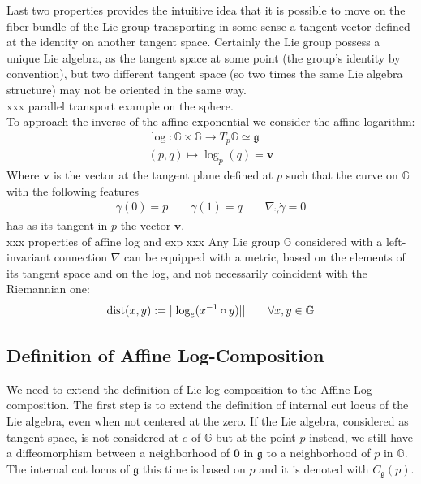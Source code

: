 Last two properties provides the intuitive idea that it is possible to move on the fiber bundle of the Lie group transporting in some sense a tangent vector defined at the identity on another tangent space. Certainly the Lie group possess a unique Lie algebra, as the tangent space at some point (the group's identity by convention), but two different tangent space (so two times the same Lie algebra structure) may not be oriented in the same way. \\
xxx parallel transport example on the sphere.\\
To approach the inverse of the affine exponential we consider the affine logarithm:
\begin{align*}
\log :  \mathbb{G}  \times \mathbb{G}   \longrightarrow T_{p}\mathbb{G}   \simeq \mathfrak{g} 
\\ 
(p,q) \longmapsto \log_{p}(q)  = \mathbf{v} 
\end{align*}
Where $\mathbf{v} $ is the vector at the tangent plane defined at $p$ such that the curve on $\mathbb{G} $ with the following features
\begin{align*}
\gamma(0) = p\qquad  \gamma(1) = q \qquad \nabla_{\dot{\gamma}}\dot{\gamma} = 0 
\end{align*}
has as its tangent in $p$ the vector $\mathbf{v}$.\\
xxx properties of affine log and exp xxx
Any Lie group $\mathbb{G}$ considered with a left-invariant connection $\nabla$ can be equipped with a metric,  based on the elements of its tangent space and on the log, and not necessarily coincident with the Riemannian one:
\begin{align*} 
\text{dist}(x,y) := \vert\lvert \log_{e}(x^{-1}\circ y)  \rvert\vert \qquad \forall x, y \in \mathbb{G}
\end{align*}

\subsection{Definition of Affine Log-Composition}
We need to extend the definition of Lie log-composition to the Affine Log-composition. The first step is to extend the definition of internal cut locus of the Lie algebra, even when not centered at the zero. 
If the Lie algebra, considered as tangent space, is not considered at $e$ of $\mathbb{G}$ but at the point $p$ instead, we still have a diffeomorphism between a neighborhood of $\mathbf{0}$ in $\mathfrak{g}$ to a neighborhood of $p$ in $\mathbb{G}$. The internal cut locus of $\mathfrak{g}$ this time is based on $p$ and it is denoted with $C_{\mathfrak{g}}(p)$.

